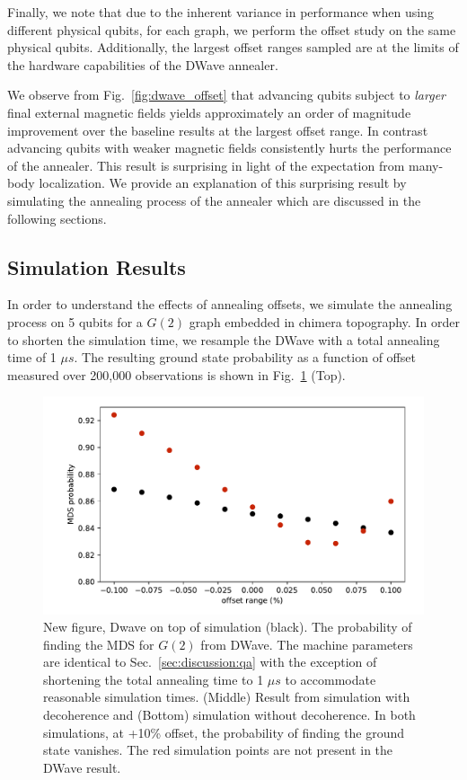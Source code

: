\documentclass[prd,twocolumn,tightenlines,preprintnumbers,showpacs,superscriptaddress,notitlepage,nofootinbib,eqsecnum,floatfix,longbibliography]{revtex4}
\begin{document}
Finally, we note that due to the inherent variance in performance when using different physical qubits, for each graph, we perform the offset study on the same physical qubits. Additionally, the largest offset ranges sampled are at the limits of the hardware capabilities of the DWave annealer.

We observe from Fig.~\ref{fig:dwave_offset} that advancing qubits subject to \textit{larger} final external magnetic fields yields approximately an order of magnitude improvement over the baseline results at the largest offset range. In contrast advancing qubits with weaker magnetic fields consistently hurts the performance of the annealer. This result is surprising in light of the expectation from many-body localization. We provide an explanation of this surprising result by simulating the annealing process of the annealer which are discussed in the following sections.

\subsection{Simulation Results}

In order to understand the effects of annealing offsets, we simulate the annealing process on 5 qubits for a $G(2)$ graph embedded in chimera topography. In order to shorten the simulation time, we resample the DWave with a total annealing time of 1 $\mu s$. The resulting ground state probability as a function of offset measured over 200,000 observations is shown in Fig.~\ref{fig:dwave1us} (Top).

\begin{figure}
	\centering
	\includegraphics[width=\columnwidth]{./figures/sim_deco.pdf}
	\caption{ {\color{red} New figure, Dwave on top of simulation (black).} The probability of finding the MDS for $G(2)$ from DWave. The machine parameters are identical to Sec.~\ref{sec:discussion:qa} with the exception of shortening the total annealing time to 1 $\mu s$ to accommodate reasonable simulation times. (Middle) Result from simulation with decoherence and (Bottom) simulation without decoherence. In both simulations, at +10\% offset, the probability of finding the ground state vanishes. The red simulation points are not present in the DWave result.}
	\label{fig:dwave1us}
\end{figure}
\end{document}
